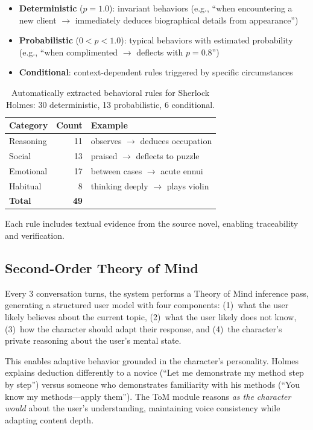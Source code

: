 \documentclass[11pt,a4paper]{article}
\begin{document}
\begin{itemize}
\setlength\itemsep{0pt}
\item \textbf{Deterministic} ($p=1.0$): invariant behaviors (e.g., ``when encountering a new client $\to$ immediately deduces biographical details from appearance'')
\item \textbf{Probabilistic} ($0 < p < 1.0$): typical behaviors with estimated probability (e.g., ``when complimented $\to$ deflects with $p=0.8$'')
\item \textbf{Conditional}: context-dependent rules triggered by specific circumstances
\end{itemize}

\begin{table}[t]
\centering
\small
\begin{tabular}{@{}lrl@{}}
\toprule
\textbf{Category} & \textbf{Count} & \textbf{Example} \\
\midrule
Reasoning & 11 & observes $\to$ deduces occupation \\
Social & 13 & praised $\to$ deflects to puzzle \\
Emotional & 17 & between cases $\to$ acute ennui \\
Habitual & 8 & thinking deeply $\to$ plays violin \\
\midrule
\textbf{Total} & \textbf{49} & \\
\bottomrule
\end{tabular}
\caption{Automatically extracted behavioral rules for Sherlock Holmes: 30 deterministic, 13 probabilistic, 6 conditional.}
\label{tab:logic}
\end{table}

Each rule includes textual evidence from the source novel, enabling traceability and verification.

\subsection{Second-Order Theory of Mind}
\label{sec:tom}

Every 3 conversation turns, the system performs a Theory of Mind inference pass, generating a structured user model with four components:
(1)~what the user likely believes about the current topic,
(2)~what the user likely does not know,
(3)~how the character should adapt their response, and
(4)~the character's private reasoning about the user's mental state.

This enables adaptive behavior grounded in the character's personality.
Holmes explains deduction differently to a novice (``Let me demonstrate my method step by step'') versus someone who demonstrates familiarity with his methods (``You know my methods---apply them'').
The ToM module reasons \textit{as the character would} about the user's understanding, maintaining voice consistency while adapting content depth.
\end{document}
